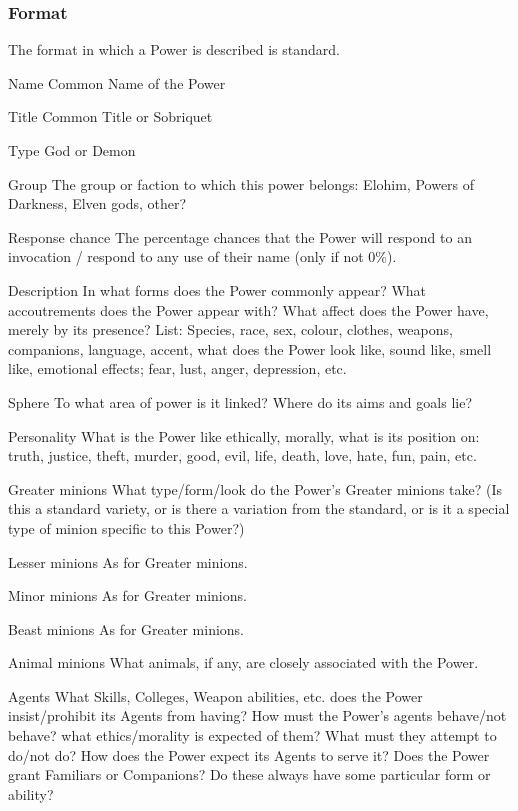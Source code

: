 \subsubsection{Format}
The format in which a Power is described is standard.

\begin{Description}
\item[Name] Common Name of the Power
\item[Title] Common Title or Sobriquet
\item[Type] God or Demon
\item[Group] The group or faction to which this power belongs: Elohim, Powers of Darkness, Elven gods, other?
\item[Response chance] The percentage chances that the Power will respond to an invocation / respond to any use of their name (only if not 0\%).
\item[Description] In what forms does the Power commonly appear? What accoutrements does the Power appear with?  What affect does the Power have, merely by its presence?  List: Species, race, sex, colour, clothes, weapons, companions, language, accent, what does the Power look like, sound like, smell like, emotional effects; fear, lust, anger, depression, etc.
\item[Sphere] To what area of power is it linked? Where do its aims and goals lie?
\item[Personality] What is the Power like ethically, morally, what is its position on: truth, justice, theft, murder, good, evil, life, death, love, hate, fun, pain, etc.
\item[Greater minions] What type/form/look do the Power's Greater minions take?  (Is this a standard variety, or is there a variation from the standard, or is it a special type of minion specific to this Power?)
\item[Lesser minions] As for Greater minions.
\item[Minor minions] As for Greater minions.
\item[Beast minions] As for Greater minions.
\item[Animal minions] What animals, if any, are closely associated with the Power.
\item[Agents] What Skills, Colleges, Weapon abilities, etc. does the Power insist/prohibit its Agents from having?  How must the Power's agents behave/not behave? what ethics/morality is expected of them?  What must they attempt to do/not do?  How does the Power expect its Agents to serve it?  Does the Power grant Familiars or Companions?  Do these always have some particular form or ability?

\end{Description}
